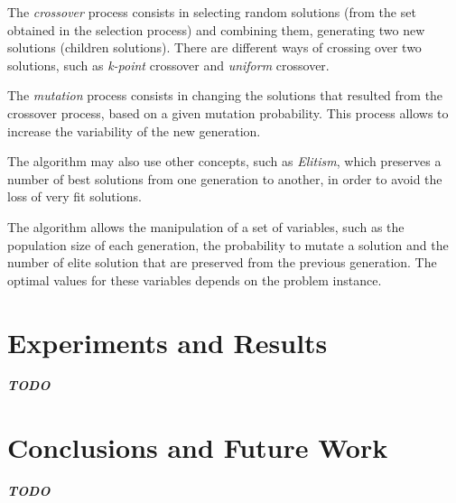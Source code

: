 \documentclass[conference]{IEEEtran}
\begin{document}
The \textit{crossover} process consists in selecting random solutions (from the set obtained in the selection process) and combining them, generating two new solutions (children solutions). There are different ways of crossing over two solutions, such as \textit{k-point} crossover and \textit{uniform} crossover.

The \textit{mutation} process consists in changing the solutions that resulted from the crossover process, based on a given mutation probability. This process allows to increase the variability of the new generation.

The algorithm may also use other concepts, such as \textit{Elitism}, which preserves a number of best solutions from one generation to another, in order to avoid the loss of very fit solutions.

The algorithm allows the manipulation of a set of variables, such as the population size of each generation, the probability to mutate a solution and the number of elite solution that are preserved from the previous generation. The optimal values for these variables depends on the problem instance.

\section{Experiments and Results} \label{sec:ear}

\textbf{\textit{TODO}}

\section{Conclusions and Future Work}

\textbf{\textit{TODO}}

\begin{thebibliography}{00}
    



\end{thebibliography}
\end{document}
